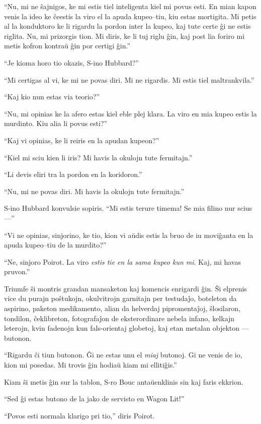 ``Nu, mi ne ŝajnigos, ke mi estis tiel inteligenta kiel mi povus esti. En mian kapon venis la ideo ke ĉeestis la viro el la apuda kupeo--tiu, kiu estas mortigita. Mi petis al la konduktoro ke li rigardu la pordon inter la kupeo, kaj tute certe ĝi ne estis riglita. Nu, mi prizorgis tion. Mi diris, ke li tuj riglu ĝin, kaj post lia foriro mi metis kofron kontraŭ ĝin por certigi ĝin.''

``Je kioma horo tio okazis, S-ino Hubbard?''

``Mi certigas al vi, ke mi ne povas diri. Mi ne rigardis. Mi estis tiel maltrankvila.''

``Kaj kio nun estas via teorio?''

``Nu, mi opinias ke la afero estas kiel eble plej klara. La viro en mia kupeo estis la murdinto. Kiu alia li povus esti?''

``Kaj vi opinias, ke li reiris en la apudan kupeon?''

``Kiel mi sciu kien li iris? Mi havis la okulojn tute fermitajn.''

``Li devis eliri tra la pordon en la koridoron.''

``Nu, mi ne povas diri. Mi havis la okulojn tute fermitajn.''

S-ino Hubbard konvulsie sopiris. ``Mi estis terure timema! Se mia filino nur scius---''

``Vi ne opinias, sinjorino, ke tio, kion vi aŭdis estis la bruo de iu moviĝanta en la apuda kupeo--tiu de la murdito?''

``Ne, sinjoro Poirot. La viro \emph{estis tie en la sama kupeo kun mi}. Kaj, mi havas pruvon.''

Triumfe ŝi montris grandan mansaketon kaj komencis enrigardi ĝin. Ŝi elprenis vice du purajn poŝtukojn, okulvitrojn garnitajn per testudaĵo, boteleton da aspirino, paketon medikamento, alian da helverdaj pipromentaĵoj, ŝlosilaron, tondilon, ĉeklibreton, fotografaĵon de eksterordinare nebela infano, kelkajn leterojn, kvin fadenojn kun fals-orientaj globetoj, kaj etan metalan objekton --- butonon.

``Rigardu ĉi tiun butonon. Ĝi ne estas unu el \emph{miaj} butonoj. Gi ne venis de io, kion mi posedas. Mi trovis ĝin hodiaŭ kiam mi ellitiĝis.''

Kiam ŝi metis ĝin sur la tablon, S-ro Bouc antaŭenklinis sin kaj faris ekkrion.

``Sed ĝi estas butono de la jako de servisto en Wagon Lit!''

``Povos esti normala klarigo pri tio,'' diris Poirot.

